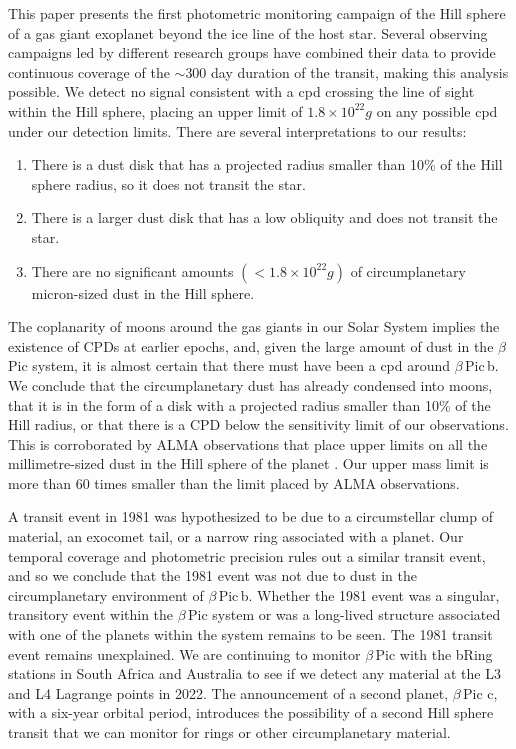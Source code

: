 \documentclass[longauth]{aa} %
\newcommand{\bpb}{$\beta$\,Pic\,b}
\newcommand{\bp}{$\beta$\,Pic}
\begin{document}
This paper presents the first photometric monitoring campaign of the Hill sphere of a gas giant exoplanet beyond the ice line of the host star.
%
Several observing campaigns led by different research groups have combined their data to provide continuous coverage of the $\sim 300$ day duration of the transit, making this analysis possible.
%
We detect no signal consistent with a \ac{cpd} crossing the line of sight within the Hill sphere, placing an upper limit of $1.8\times 10^{22}g$ on any possible \ac{cpd} under our detection limits.
%
There are several interpretations to our results:
\begin{enumerate}
    \item There is a dust disk that has a projected radius smaller than 10\% of the Hill sphere radius, so it does not transit the star.
    \item There is a larger dust disk that has a low obliquity and does not transit the star.
    \item There are no significant amounts $(<1.8\times 10^{22}g)$ of circumplanetary micron-sized dust in the Hill sphere.
\end{enumerate}

%
The coplanarity of moons around the gas giants in our Solar System implies the existence of CPDs at earlier epochs, and, given the large amount of dust in the \bp{} system, it is almost certain that there must have been a \ac{cpd} around \bpb{}.
%
We conclude that the circumplanetary dust has already condensed into moons, that it is in the form of a disk with a projected radius smaller than 10\% of the Hill radius, or that there is a CPD below the sensitivity limit of our observations.
This is corroborated by ALMA observations that place upper limits on all the millimetre-sized dust in the Hill sphere of the planet \citep{Perez192}.
%
Our upper mass limit is more than 60 times smaller than the limit placed by ALMA observations.

A transit event in 1981 was hypothesized to be due to a circumstellar clump of material, an exocomet tail, or a narrow ring associated with a planet.
%
Our temporal coverage and photometric precision rules out a similar transit event, and so we conclude that the 1981 event was not due to dust in the circumplanetary environment of \bpb{}.
%
Whether the 1981 event was a singular, transitory event within the \bp{} system or was a long-lived structure associated with one of the planets within the system remains to be seen.
%
The 1981 transit event remains unexplained.
%
We are continuing to monitor \bp{} with the bRing stations in South Africa and Australia to see if we detect any material at the L3 and L4 Lagrange points in 2022.
%
The announcement of a second planet, \bp{} c, with a six-year orbital period, introduces the possibility of a second Hill sphere transit that we can monitor for rings or other circumplanetary material.
\end{document}
